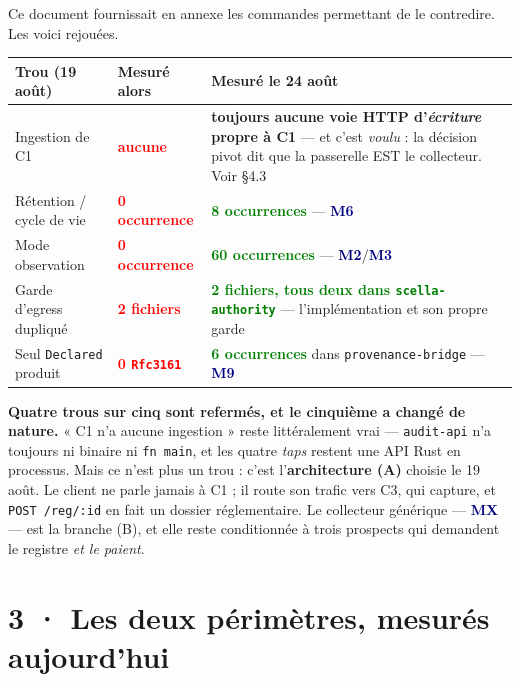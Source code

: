 \documentclass[10pt]{article}
\newcommand{\best}[1]{\textcolor{green}{\textbf{#1}}}
\newcommand{\pire}[1]{\textcolor{red}{\textbf{#1}}}
\newcommand{\moyen}[1]{\textcolor{amber}{\textbf{#1}}}
\newcommand{\code}[1]{\texttt{\small #1}}
\newcommand{\mm}[1]{\textbf{\textcolor{navy}{#1}}}
\begin{document}
Ce document fournissait en annexe les commandes permettant de le contredire. Les voici rejouées.

\begin{center}\small
\renewcommand{\arraystretch}{1.24}
\begin{tabular}{@{}>{\raggedright\arraybackslash}p{3.5cm} >{\raggedright\arraybackslash}p{4.0cm} >{\raggedright\arraybackslash}p{8.4cm}@{}}
\toprule
\textbf{Trou (19 août)} & \textbf{Mesuré alors} & \textbf{Mesuré le 24 août} \\
\midrule
Ingestion de C1 & \pire{aucune} & \moyen{toujours aucune voie HTTP d'\emph{écriture} propre à C1} --- et c'est \emph{voulu} : la décision pivot dit que la passerelle EST le collecteur. Voir §4.3 \\
Rétention / cycle de vie & \pire{0 occurrence} & \best{8 occurrences} --- \mm{M6} \\
Mode observation & \pire{0 occurrence} & \best{60 occurrences} --- \mm{M2}/\mm{M3} \\
Garde d'egress dupliqué & \pire{2 fichiers} & \best{2 fichiers, tous deux dans \code{scella-authority}} --- l'implémentation et son propre garde \\
Seul \code{Declared} produit & \pire{0 \code{Rfc3161}} & \best{6 occurrences} dans \code{provenance-bridge} --- \mm{M9} \\
\bottomrule
\end{tabular}
\end{center}

\begin{acquis}
\textbf{Quatre trous sur cinq sont refermés, et le cinquième a changé de nature.} « C1 n'a aucune
ingestion » reste littéralement vrai --- \code{audit-api} n'a toujours ni binaire ni \code{fn main},
et les quatre \emph{taps} restent une API Rust en processus. Mais ce n'est plus un trou : c'est
l'\textbf{architecture (A)} choisie le 19 août. Le client ne parle jamais à C1 ; il route son trafic
vers C3, qui capture, et \code{POST /reg/:id} en fait un dossier réglementaire. Le collecteur
générique --- \mm{MX} --- est la branche (B), et elle reste conditionnée à trois prospects qui
demandent le registre \emph{et le paient}.
\end{acquis}

\section{3 · Les deux périmètres, mesurés aujourd'hui}
\end{document}
